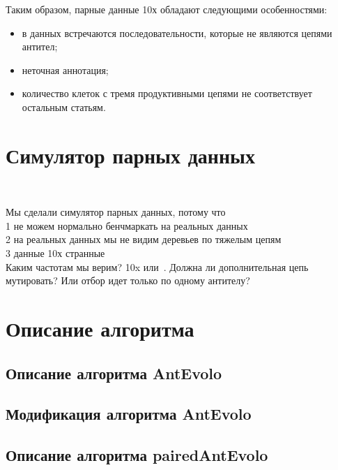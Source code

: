 \documentclass{spbau-diploma}
\begin{document}
   
   
   
Таким образом, парные данные 10х обладают следующими особенностями:
\begin{itemize}
    \item в данных встречаются последовательности, которые не являются цепями антител;
    \item неточная аннотация;
    \item количество клеток с тремя продуктивными цепями не соответствует остальным статьям.
\end{itemize}



\section{Симулятор парных данных}

~\cite{safonova2015igsimulator}

Мы сделали симулятор парных данных, потому что \\
1 не можем нормально бенчмаркать на реальных данных \\
2 на реальных данных мы не видим деревьев по тяжелым цепям \\
3 данные 10х странные \\


Каким частотам мы верим? 10x или~\cite{dekosky2015depth}.
Должна ли дополнительная цепь мутировать? Или отбор идет только по одному антителу?




\section{Описание алгоритма}

\subsection{Описание алгоритма AntEvolo}

\subsection{Модификация алгоритма AntEvolo}

\subsection{Описание алгоритма pairedAntEvolo}
\end{document}
